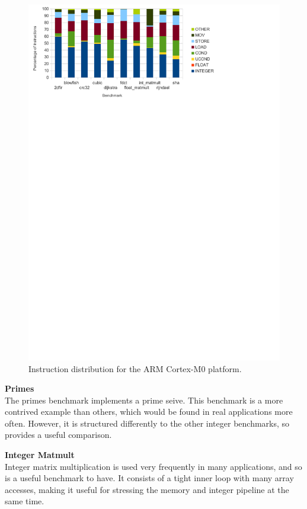 \documentclass[twocolumn]{article}
\begin{document}
\begin{figure}[t]
	\includegraphics[width=\linewidth,clip, trim=0 8.5in 2in 0]{xmos.pdf}
	\caption{Instruction distribution for the ARM Cortex-M0 platform.}
	\label{Fig:InstructionDistributionARM}
\end{figure}

\vspace{3mm}
\textbf{Primes}\\
The primes benchmark implements a prime seive. This benchmark is a more contrived example than others, which would be found in real applications more often. However, it is structured differently to the other integer benchmarks, so provides a useful comparison.

\vspace{3mm}
\textbf{Integer Matmult}\\
Integer matrix multiplication is used very frequently in many applications, and so is a useful benchmark to have. It consists of a tight inner loop with many array accesses, making it useful for stressing the memory and integer pipeline at the same time.
\end{document}
